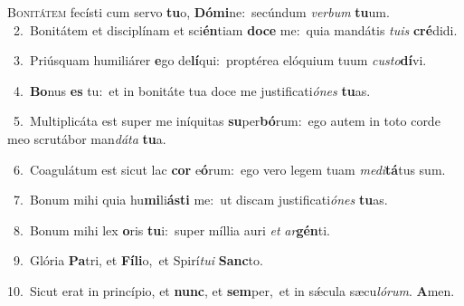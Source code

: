 \lettrine{\initial\textcolor{\initialcolor}{B}}{onitátem} fecísti cum servo \textbf{tu}\-o, \textbf{Dó}\-\textbf{mi}ne:~\star secúndum \textit{ver}\-\textit{bum} \textbf{tu}\-um.\\
{\numbfont\textcolor{\numbcolor}{~2.}}~Bonitátem et disciplínam et sci\-\textbf{én}\-tiam \textbf{do}\-\textbf{ce} me:~\star quia mandátis \textit{tu}\-\textit{is} \textbf{cré}\-didi.\par
{\numbfont\textcolor{\numbcolor}{~3.}}~Priúsquam humiliárer \textbf{e}\-go de\-\textbf{lí}\-qui:~\star proptérea elóquium tuum \textit{cus}\-\textit{to}\textbf{dí}vi.\par
{\numbfont\textcolor{\numbcolor}{~4.}}~\-\textbf{Bo}\-nus \textbf{es} tu:~\star et in bonitáte tua doce me justificati\-\textit{ó}\-\textit{nes} \textbf{tu}\-as.\par
{\numbfont\textcolor{\numbcolor}{~5.}}~Multiplicáta est super me iníquitas \textbf{su}\-per\-\textbf{bó}\-rum:~\star ego autem in toto corde meo scrutábor man\-\textit{dá}\-\textit{ta} \textbf{tu}\-a.\par
{\numbfont\textcolor{\numbcolor}{~6.}}~Coagulátum est sicut lac \textbf{cor} e\-\textbf{ó}\-rum:~\star ego vero legem tuam \textit{me}\-\textit{di}\textbf{tá}tus sum.\par
{\numbfont\textcolor{\numbcolor}{~7.}}~Bonum mihi quia hu\-\textbf{mi}\-li\-\textbf{ás}\-\textbf{ti} me:~\star ut discam justificati\-\textit{ó}\-\textit{nes} \textbf{tu}\-as.\par
{\numbfont\textcolor{\numbcolor}{~8.}}~Bonum mihi lex \textbf{o}\-ris \textbf{tu}\-i:~\star super míllia auri \textit{et} \textit{ar}\-\textbf{gén}ti.\par
{\numbfont\textcolor{\numbcolor}{~9.}}~Glória \textbf{Pa}\-tri, et \textbf{Fí}\-\textbf{li}o,~\star et Spirí\-\textit{tu}\-\textit{i} \textbf{Sanc}\-to.\par
{\numbfont\textcolor{\numbcolor}{10.}}~Sicut erat in princípio, et \textbf{nunc}\-, et \textbf{sem}\-per,~\star et in sǽcula sæcu\-\textit{ló}\-\textit{rum}. \textbf{A}\-men.\par
